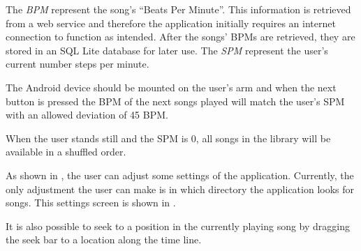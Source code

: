The \textit{BPM} represent the song's ``Beats Per Minute''. This information is retrieved from a web service and therefore the application initially requires an internet connection to function as intended. After the songs' BPMs are retrieved, they are stored in an SQL Lite database for later use. The \textit{SPM} represent the user's current number steps per minute.

The Android device should be mounted on the user's arm and when the next button is pressed the BPM of the next songs played will match the user's SPM with an allowed deviation of 45 BPM.

When the user stands still and the SPM is 0, all songs in the library will be available in a shuffled order.

As shown in , the user can adjust some settings of the application. Currently, the only adjustment the user can make is in which directory the application looks for songs. This settings screen is shown in . 

It is also possible to seek to a position in the currently playing song by dragging the seek bar to a location along the time line. 


